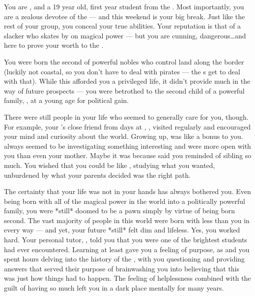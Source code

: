 \documentclass[char]{GL2020}
\begin{document}
\name{\cChupStudent{}}
 
You are \cChupStudent{\intro}, and a 19 year old, first year student from the \pFarm{}. Most importantly, you are a zealous devotee of the \pGoaties{} — and this weekend is your big break. Just like the rest of your group, you conceal your true abilities. Your reputation is that of a slacker who skates by on \cChupStudent{\their} magical power — but you are cunning, dangerous\ldots and here to prove your worth to the \pGoaties{}.
 
You were born the second \cChupStudent{\offspring} of powerful nobles who control land along the \pTech{} border (luckily not coastal, so you don't have to deal with pirates — the \cWildCard{\formal}s get to deal with that). While this afforded you a privileged life, it didn't provide much in the way of future prospects — you were betrothed to the second child of a powerful \pTech{} family, \cHeir{\full}, at a young age for political gain. 

There were still people in your life who seemed to generally care for you, though. For example, your \cWildCardFriend{\parent}’s close friend from \cWildCardFriend{\their} days at \pSchool{}, \cWildCard{}, visited regularly and encouraged your mind and curiosity about the world. Growing up, \cWildCard{} was like a bonus \cWildCard{\auncle} to you. \cWildCard{\They} always seemed to be investigating something interesting and were more open with you than even your mother. Maybe it was because  \cWildCard{\they} said you reminded \cWildCard{\them} of \cWildCard{\their} sibling so much. You wished that you could be like \cWildCard{\them}, studying what you wanted, unburdened by what your parents decided was the right path.

The certainty that your life was not in your hands has always bothered you. Even being born with all of the magical power in the world into a politically powerful family, you were *still* doomed to be a pawn simply by virtue of being born second. The vast majority of people in this world were born with less than you in every way — and yet, your future *still* felt dim and lifeless. Yes, you worked hard. Your personal tutor, \cHistory{\full}, told you that you were one of the brightest students \cHistory{\they} had ever encountered. Learning at least gave you a feeling of purpose, as \cHistory{} and you spent hours delving into the history of the \pFarm{}, with you questioning and \cHistory{\them} providing answers that served their purpose of brainwashing you into believing that this was just how things had to happen. The feeling of helplessness combined with the guilt of having so much left you in a dark place mentally for many years.  
 
\end{document}
